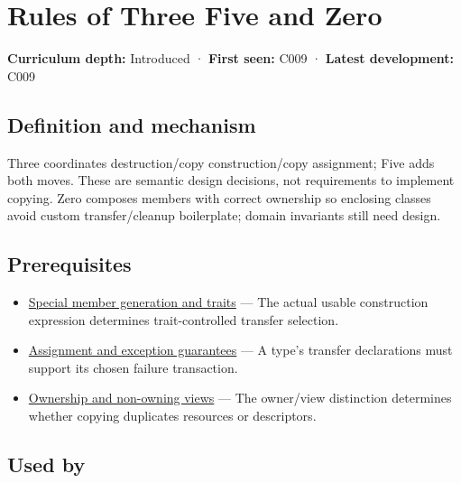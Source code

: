 \hypertarget{appendix-7679107d057e}{}\label{referencestart:appendix-7679107d057e}
\section{Rules of Three Five and Zero}\label{appendix-7679107d057e-rules-of-three-five-and-zero}

\textbf{Curriculum depth:} Introduced · \textbf{First seen:} C009 · \textbf{Latest development:} C009

\begin{allmightroledefinition}

\subsection{Definition and mechanism}\label{appendix-7679107d057e-definition-and-mechanism}

Three coordinates destruction/copy construction/copy assignment; Five adds both moves. These are semantic design decisions, not requirements to implement copying. Zero composes members with correct ownership so enclosing classes avoid custom transfer/cleanup boilerplate; domain invariants still need design.

\end{allmightroledefinition}

\subsection{Prerequisites}\label{appendix-7679107d057e-prerequisites}

\begin{itemize}
\tightlist
\item
  \hyperref[appendix-42e02a12c694]{Special member generation and traits} --- The actual usable construction expression determines trait-controlled transfer selection.
\item
  \hyperref[appendix-bea6beb5350f]{Assignment and exception guarantees} --- A type's transfer declarations must support its chosen failure transaction.
\item
  \hyperref[appendix-d52e4486f527]{Ownership and non-owning views} --- The owner/view distinction determines whether copying duplicates resources or descriptors.
\end{itemize}

\subsection{Used by}\label{appendix-7679107d057e-used-by}

